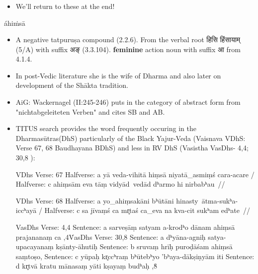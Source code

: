 \documentclass[pdf]{beamer}
\begin{document}
\begin{frame}\frametitle{}
\begin{itemize}
	\item We'll return to these at the end!
\end{itemize}
\end{frame}

\begin{frame}{áhiṁsā}
    \begin{itemize} 
    \item A negative tatpuruṣa compound (2.2.6). From the verbal root हिसि हिंसायाम् (5/A) with suffix अङ् (3.3.104). \textbf{feminine} action noun with suffix आ from 	4.1.4.
    \item In post-Vedic literature she is the wife of Dharma and also later on development of the Shākta tradition. 
    \item AiG: Wackernagel (II:245-246) puts in the category of abstract form from "nichtabgeleiteten Verben" and cites SB and AB.
    \item TITUS search provides the word frequently occuring in the Dharmasūtras(DhS) particularly of the Black Yajur-Veda (Vaisnava VDhS: Verse 67, 68 Baudhayana 	BDhS) and less in RV DhS (Vasistha VasDhs- 4,4; 30,8  ):
    
	VDhs Verse: 67 
	Halfverse: a    yā veda-vihitā hiṃsā niyatā_asmiṃś cara-acare /
	Halfverse: c    ahiṃsām eva tāṃ vidyād\ vedād dʰarmo hi nirbabʰau\ //

	VDhs Verse: 68 
	Halfverse: a    yo_ahiṃsakāni bʰūtāni hinasty\ ātma-sukʰa-iccʰayā /
	Halfverse: c    sa jīvaṃś ca mr̥taś ca_eva na kva-cit sukʰam edʰate\ //
	
	VasDhs Verse: 4,4 
	Sentence: a    sarveṣāṃ satyam a-krodʰo dānam ahiṃsā prajananaṃ ca \4,4\.
	
	VasDhs Verse: 30,8
	Sentence: a    dʰyāna-agniḥ satya-upacayanaṃ kṣānty-āhutiḥ
	Sentence: b    sruvaṃ hrīḥ puroḍāśam ahiṃsā saṃtoṣo,
	Sentence: c    yūpaḥ kr̥ccʰraṃ bʰūtebʰyo 'bʰaya-dākṣiṇyām iti
	Sentence: d    kr̥tvā kratu mānasaṃ yāti kṣayaṃ budʰaḥ ,8\.

     
    \end {itemize}
\end{frame}
\end{document}
